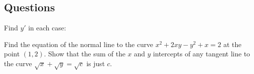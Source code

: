 \subsection*{Questions}
\begin{questions}
  \question Find $ y' $ in each case:
    \begin{multicols}{3}
    \end{multicols}
  \question Find the equation of the normal line to the curve $ x^2 + 2xy - y^2 + x = 2 $ at the point $ (1, 2) $.
  \question Show that the sum of the $ x $ and $ y $ intercepts of any tangent line to the curve $ \sqrt{x} + \sqrt{y} = \sqrt{c} $
            is just $ c $.
\end{questions}

